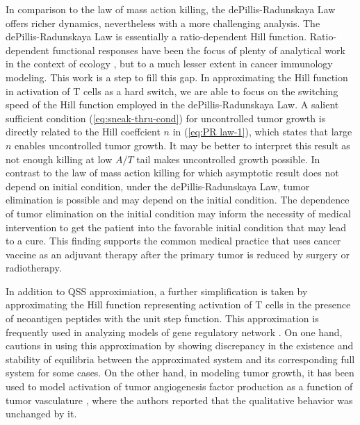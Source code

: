 \documentclass[review,authoryear]{elsarticle}
\begin{document}
In comparison to the law of mass action killing, the dePillis-Radunskaya
Law offers richer dynamics, nevertheless with a more challenging analysis. The
dePillis-Radunskaya Law is essentially a ratio-dependent Hill function.
Ratio-dependent functional responses have been the focus of plenty
of analytical work in the context of ecology \citep{Abrams2000,Hsu2001,Hsu2003}, but to a much lesser extent in cancer
immunology modeling. This work is a step to fill this gap. In approximating
the Hill function in activation of T cells as a hard switch, we are
able to focus on the switching speed of the Hill function employed
in the dePillis-Radunskaya Law. A salient sufficient condition (\ref{eq:sneak-thru-cond}) for
uncontrolled tumor growth is directly related to the Hill coeffcient $n$ in (\ref{eq:PR law-1}), which states that large $n$ enables
uncontrolled tumor growth. It may be better to interpret this result as not
enough killing at low $A/T$ tail makes uncontrolled growth possible.
In contrast to the law of mass action killing for which asymptotic
result does not depend on initial condition, under the dePillis-Radunskaya
Law, tumor elimination is possible and may depend on the initial
condition. The dependence of tumor elimination on the initial condition may inform the necessity of medical intervention to get
the patient into the favorable initial condition that may lead to
a cure. This finding supports the common medical practice
that uses cancer vaccine as an adjuvant therapy after the primary
tumor is reduced by surgery or radiotherapy.

In addition to QSS approximiation, a further simplification is taken by approximating the Hill function representing activation of T cells in the presence of neoantigen
peptides with the unit step function. This approximation
is frequently used in analyzing models of gene regulatory network
 \citep[e.g.,][]{Glass1973,Mestl1995}. On one hand, \citet{Polynikis2009} cautions in using this approximation by showing discrepancy in the existence and stability of equilibria between the approximated system and its corresponding full system for some cases. On the other hand, in modeling tumor growth, it has been used to model activation of tumor angiogenesis factor production as a function of tumor vasculature \citep{Stamper2007}, where the authors reported that the qualitative behavior was unchanged by it.
\end{document}
